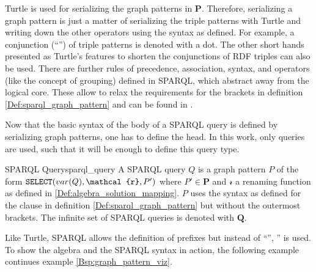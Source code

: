 Turtle is used for serializing the graph patterns in $\mathbf{P}$. Therefore, serializing a graph pattern is just a matter of serializing the triple patterns with Turtle and writing down the other operators using the syntax as defined. For example, a conjunction (``'') of triple patterns is denoted with a dot. The other short hands presented as Turtle's features to shorten the conjunctions of RDF triples can also be used. There are further rules of precedence, association, syntax, and operators (like the concept of grouping) defined in SPARQL, which abstract away from the logical core. These allow to relax the requirements for the brackets in definition \ref{Def:sparql_graph_pattern} and can be found in \cite{prudhommeaux2008sparql}. 

Now that the basic syntax of the body of a SPARQL query is defined by serializing graph patterns, one has to define the head. In this work, only  queries are used, such that it will be enough to define this query type.

\begin{Def}{SPARQL  Query}{sparql_query}
A SPARQL  query $Q$ is a graph pattern $P$ of the form $\text{\uri{SELECT}}(var(Q), \mathcal{r},P')$ where $P' \in \mathbf{P}$ and $\mathcal{r}$ a renaming function as defined in \ref{Def:algebra_solution_mapping}. $P$ uses the syntax as defined for the  clause in definition \ref{Def:sparql_graph_pattern} but without the outermost brackets. The infinite set of SPARQL  queries is denoted with $\mathbf{Q}$.
\end{Def}

Like Turtle, SPARQL allows the definition of prefixes but instead of ``'', \glqq{}'' is used.
To show the algebra and the SPARQL syntax in action, the following example continues example \ref{Bsp:graph_pattern_viz}.

